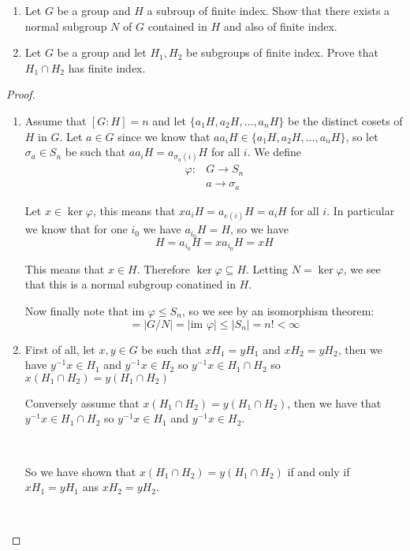 \begin{exercise}
\begin{enumerate}[label = (\alph*)]
\item Let $G$ be a group and $H$ a subroup of finite index. Show that there exists a normal subgroup $N$ of $G$ contained in $H$ and also of finite index.
\item Let $G$ be a group and let $H_1,H_2$ be subgroups of finite index. Prove that $H_1\cap H_2$ has finite index.
\end{enumerate}
\begin{proof}
\begin{enumerate}[label = (\alph*)]
\item Assume that $[G\colon H] = n$ and let $\{a_1H,a_2H,\dots, {a_n}H\}$ be the distinct cosets of $H$ in $G$. Let $a\in G$ since we know that ${aa_i}H\in \{a_1H,a_2H,\dots, {a_n}H\}$, so let $\sigma_a\in S_n$ be such that ${aa_i}H = {a_{\sigma_a(i)}}H$ for all $i$. We define\begin{align*}
\varphi\colon &G\rightarrow S_n\\
&a\rightarrow \sigma_a
\end{align*} 

Let $x\in \ker \varphi$, this means that ${xa_i}H = a_{e(i)}H = {a_i}H$ for all $i$. In particular we know that for one $i_0$ we have ${a_{i_0}}H = H$, so we have \[H={a_{i_0}}H = x{a_{i_0}}H = xH\]

This means that $x\in H$. Therefore $\ker\varphi \subseteq H$. Letting $N = \ker\varphi$, we see that this is a normal subgroup conatined in $H$.

Now finally note that $\text{im }\varphi\leq S_n$, so we see by an isomorphism theorem:\begin{equation*}
[G\colon N] = |G/N| = |\text{im }\varphi| \leq |S_n| = n!<\infty
\end{equation*}
\item First of all, let $x,y\in G$ be such that $xH_1 = yH_1$ and $xH_2 = yH_2$, then we have $y^{-1}x\in H_1$ and $y^{-1}x\in H_2$ so $y^{-1}x\in H_1\cap H_2$ so $x(H_1\cap H_2) = y(H_1\cap H_2)$ 

Conversely assume that $x(H_1\cap H_2) = y(H_1\cap H_2)$, then we have that $y^{-1}x\in H_1\cap H_2$ so $y^{-1}x\in H_1$ and $y^{-1}x\in H_2$.

\

So we have shown that $x(H_1\cap H_2) = y(H_1\cap H_2)$ if and only if $xH_1 = yH_1$ ans $xH_2=yH_2$.

\


\end{enumerate}
\end{proof}
\end{exercise}

